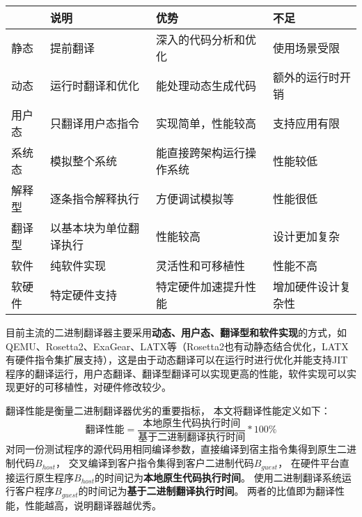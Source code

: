 \begin{table}[!htbp]
  \label{tab:BTs}
\centering
\footnotesize%
\setlength{\tabcolsep}{4pt}%
\renewcommand{\arraystretch}{1.2}%
  \begin{tabular}{llll}
  \hline
      & 说明                  & 优势           & 不足                  \\ \hline
  静态  & 提前翻译                & 深入的代码分析和优化   & 使用场景受限  \\
  动态  & 运行时翻译和优化            & 能处理动态生成代码    & 额外的运行时开销    \\
  \hline
  用户态 & 只翻译用户态指令            & 实现简单，性能较高    & 支持应用有限     \\
  系统态 &  模拟整个系统 & 能直接跨架构运行操作系统 & 性能较低                \\
  \hline
  解释型 & 逐条指令解释执行            & 方便调试模拟等      & 性能很低 \\
  翻译型 & 以基本块为单位翻译执行       & 性能较高         & 设计更加复杂              \\
  \hline
  软件  & 纯软件实现               & 灵活性和可移植性     & 性能不高                \\
  软硬件 & 特定硬件支持    & 特定硬件加速提升性能   & 增加硬件设计复杂性      \\ \hline   
  \end{tabular}
  \end{table}

目前主流的二进制翻译器主要采用\textbf{动态、用户态、翻译型和软件实现}的方式，如QEMU\cite{bellardQEMUFastPortable2005}、Rosetta2\cite{RosettaTranslationEnvironment, RunningIntelBinaries}、ExaGear\cite{KunPengExaGear}、LATX\cite{LoongArchEnv2022, LoongArch2023}等（Rosetta2也有动静态结合优化，LATX有硬件指令集扩展支持），这是由于动态翻译可以在运行时进行优化并能支持JIT程序的翻译运行，用户态翻译、翻译型翻译可以实现更高的性能，软件实现可以实现更好的可移植性，对硬件修改较少。



翻译性能是衡量二进制翻译器优劣的重要指标，
本文将翻译性能定义如下：
\begin{equation}\label{eq:bt_performance}
    \text{翻译性能} = \frac{\text{本地原生代码执行时间}}{\text{基于二进制翻译执行时间}} * 100\%
\end{equation}
对同一份测试程序的源代码用相同编译参数，直接编译到宿主指令集得到原生二进制代码$B_{host}$，
交叉编译到客户指令集得到客户二进制代码$B_{guest}$，
在硬件平台直接运行原生程序$B_{host}$的时间记为\textbf{本地原生代码执行时间}。
使用二进制翻译系统运行客户程序$B_{guest}$的时间记为\textbf{基于二进制翻译执行时间}。
两者的比值即为翻译性能，性能越高，说明翻译器越优秀。


